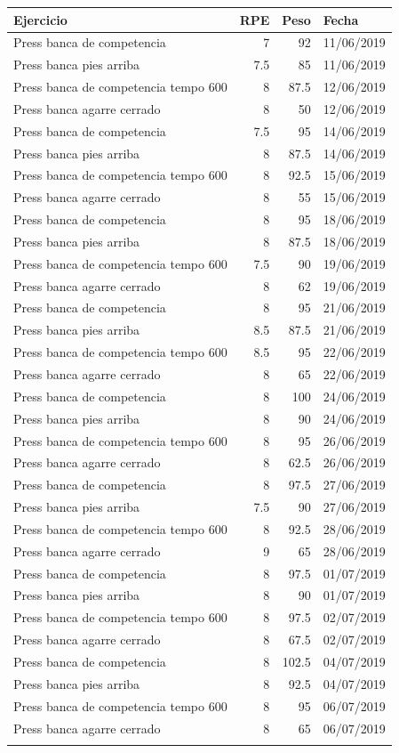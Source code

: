 \documentclass[11pt]{article}
\begin{document}
\begin{center}
\label{tab:org8d77056}
\begin{tabular}{lrrl}
Ejercicio & RPE & Peso & Fecha\\
\hline
Press banca de competencia & 7 & 92 & 11/06/2019\\
Press banca pies arriba & 7.5 & 85 & 11/06/2019\\
Press banca de competencia tempo 600 & 8 & 87.5 & 12/06/2019\\
Press banca agarre cerrado & 8 & 50 & 12/06/2019\\
Press banca de competencia & 7.5 & 95 & 14/06/2019\\
Press banca pies arriba & 8 & 87.5 & 14/06/2019\\
Press banca de competencia tempo 600 & 8 & 92.5 & 15/06/2019\\
Press banca agarre cerrado & 8 & 55 & 15/06/2019\\
Press banca de competencia & 8 & 95 & 18/06/2019\\
Press banca pies arriba & 8 & 87.5 & 18/06/2019\\
Press banca de competencia tempo 600 & 7.5 & 90 & 19/06/2019\\
Press banca agarre cerrado & 8 & 62 & 19/06/2019\\
Press banca de competencia & 8 & 95 & 21/06/2019\\
Press banca pies arriba & 8.5 & 87.5 & 21/06/2019\\
Press banca de competencia tempo 600 & 8.5 & 95 & 22/06/2019\\
Press banca agarre cerrado & 8 & 65 & 22/06/2019\\
Press banca de competencia & 8 & 100 & 24/06/2019\\
Press banca pies arriba & 8 & 90 & 24/06/2019\\
Press banca de competencia tempo 600 & 8 & 95 & 26/06/2019\\
Press banca agarre cerrado & 8 & 62.5 & 26/06/2019\\
Press banca de competencia & 8 & 97.5 & 27/06/2019\\
Press banca pies arriba & 7.5 & 90 & 27/06/2019\\
Press banca de competencia tempo 600 & 8 & 92.5 & 28/06/2019\\
Press banca agarre cerrado & 9 & 65 & 28/06/2019\\
Press banca de competencia & 8 & 97.5 & 01/07/2019\\
Press banca pies arriba & 8 & 90 & 01/07/2019\\
Press banca de competencia tempo 600 & 8 & 97.5 & 02/07/2019\\
Press banca agarre cerrado & 8 & 67.5 & 02/07/2019\\
Press banca de competencia & 8 & 102.5 & 04/07/2019\\
Press banca pies arriba & 8 & 92.5 & 04/07/2019\\
Press banca de competencia tempo 600 & 8 & 95 & 06/07/2019\\
Press banca agarre cerrado & 8 & 65 & 06/07/2019\\
 &  &  & \\
\end{tabular}
\end{center}
\end{document}
